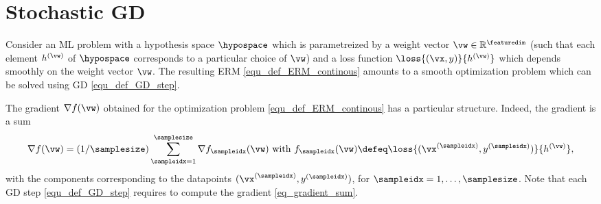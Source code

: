 \documentclass[12pt]{report}
\begin{document}
\begin{center}
\end{center}
 
 
\section{Stochastic GD}

Consider an ML problem with a hypothesis space $\hypospace$ which is parametreized by a 
weight vector $\vw \in \mathbb{R}^{\featuredim}$ (such that each element $h^{(\vw)}$ of $\hypospace$ 
corresponds to a particular choice of $\vw$) and a loss function $\loss{(\vx,y)}{h^{(\vw)}}$ which 
depends smoothly on the weight vector $\vw$. The resulting ERM \eqref{equ_def_ERM_continous} 
amounts to a smooth optimization problem which can be solved using GD \eqref{equ_def_GD_step}. 

The gradient $\nabla f(\vw)$ obtained for the optimization problem 
\eqref{equ_def_ERM_continous} has a particular structure. Indeed, the 
gradient is a sum 
\vspace*{-2mm}
\begin{equation}
\label{eq_gradient_sum}
\nabla f(\vw) = (1/\samplesize) \sum_{\sampleidx=1}^{\samplesize} \nabla f_{\sampleidx}(\vw)   \mbox{ with } f_{\sampleidx}(\vw) \defeq \loss{(\vx^{(\sampleidx)},y^{(\sampleidx)})}{h^{(\vw)}}, 
\end{equation} 
with the components corresponding to the datapoints $(\vx^{(\sampleidx)},y^{(\sampleidx)})$, for $\sampleidx=1,\ldots,\samplesize$. 
Note that each GD step \eqref{equ_def_GD_step} requires to compute the gradient \eqref{eq_gradient_sum}. 
\end{document}
